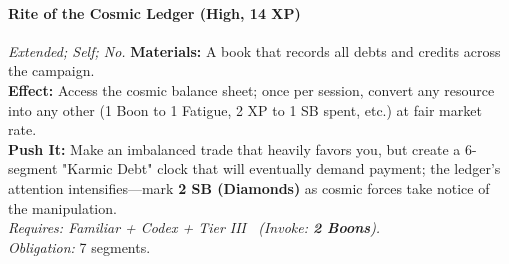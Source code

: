 \paragraph{Rite of the Cosmic Ledger (High, 14 XP)} \emph{Extended; Self; No.}
\textbf{Materials:} A book that records all debts and credits across the campaign. \\
\textbf{Effect:} Access the cosmic balance sheet; once per session, convert any resource into any other (1 Boon to 1 Fatigue, 2 XP to 1 SB spent, etc.) at fair market rate. \\
\textbf{Push It:} Make an imbalanced trade that heavily favors you, but create a 6-segment "Karmic Debt" clock that will eventually demand payment; the ledger's attention intensifies—mark \textbf{2 SB (Diamonds)} as cosmic forces take notice of the manipulation. \\
\emph{Requires: Familiar + Codex + Tier III \ (\textit{Invoke:} \textbf{2 Boons}).} \\
\emph{Obligation:} 7 segments.